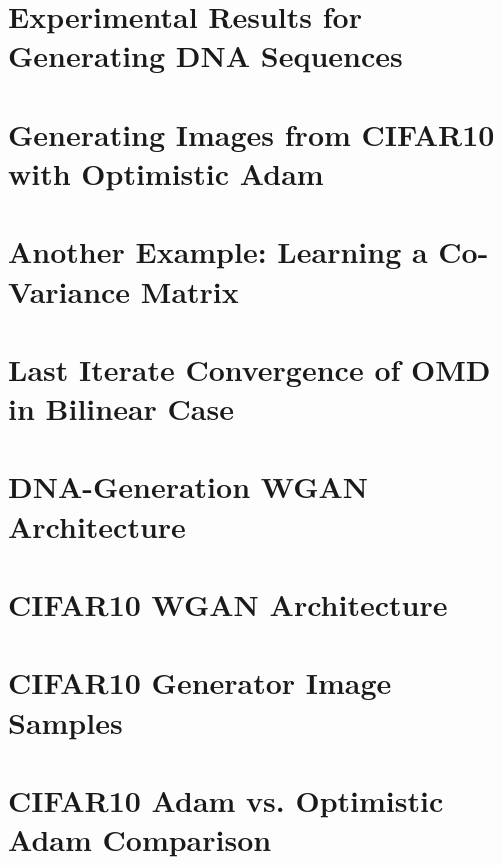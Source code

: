 \documentclass{article} %
\newcommand{\1}{\mathbbm{1}}
\theoremstyle{plain}
\begin{document}
\section{Experimental Results for Generating DNA Sequences}

\vspace{-.1in}
\section{Generating Images from CIFAR10 with Optimistic Adam}\label{sec:cifar10}





\newpage

\appendix



\section{Another Example: Learning a Co-Variance Matrix}\label{sec:covariance}


\section{Last Iterate Convergence of OMD in Bilinear Case}\label{sec:appendix:last-iterate}


\section{DNA-Generation WGAN Architecture}\label{sec:appendix-dna-arch}\label{sec:apdxdna}


\section{CIFAR10 WGAN Architecture}\label{sec:appendix-cifar10-arch}


\section{CIFAR10 Generator Image Samples}\label{sec:appendix-cifar10}


\section{CIFAR10 Adam vs. Optimistic Adam Comparison}\label{sec:appendix-errorbars}

\end{document}
